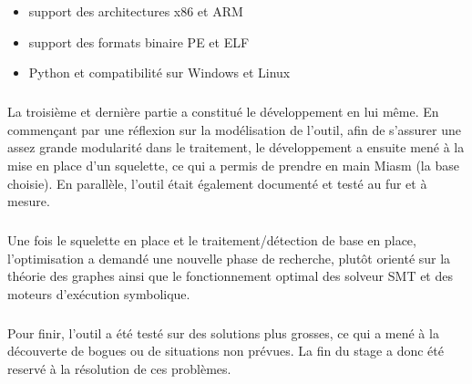 \begin{itemize}
\item support des architectures x86 et ARM
\item support des formats binaire PE et ELF
\item Python et compatibilité sur Windows et Linux
\end{itemize}
\subparagraph{}
La troisième et dernière partie a constitué le développement en lui même. En commençant par une réflexion sur la modélisation de l'outil, afin de s'assurer une assez grande modularité dans le
traitement, le développement a ensuite mené à la mise en place d'un squelette, ce qui a permis de prendre en main Miasm (la base choisie). En parallèle, l'outil était également documenté et testé
au fur et à mesure.
\subparagraph{}
Une fois le squelette en place et le traitement/détection de base en place, l'optimisation a demandé une nouvelle phase de recherche, plutôt orienté sur la théorie des graphes ainsi que le
fonctionnement optimal des solveur SMT et des moteurs d'exécution symbolique.
\subparagraph{}
Pour finir, l'outil a été testé sur des solutions plus grosses, ce qui a mené à la découverte de bogues ou de situations non prévues. La fin du stage a donc été reservé à la résolution de
ces problèmes.
